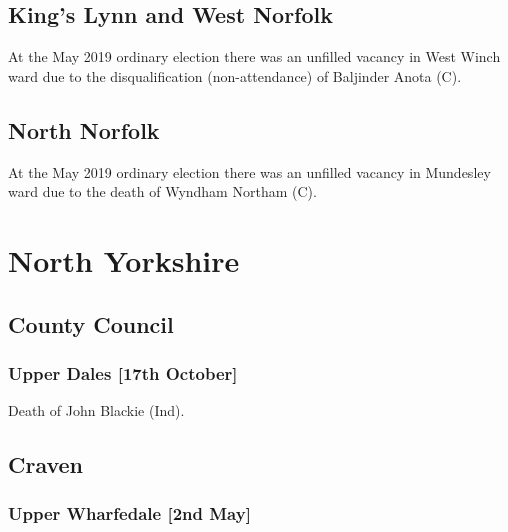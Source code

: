 \documentclass[a4paper,openany]{book}
\begin{document}
\begin{resultsiii}
\subsection*{King's Lynn and West Norfolk}

At the May 2019 ordinary election there was an unfilled vacancy in West Winch ward due to the disqualification (non-attendance) of Baljinder Anota (C).

\subsection*{North Norfolk}

At the May 2019 ordinary election there was an unfilled vacancy in Mundesley ward due to the death of Wyndham Northam (C).

\section{North Yorkshire}

\subsection*{County Council}

\subsubsection*{Upper Dales \hspace*{\fill}\nolinebreak[1]%
	\enspace\hspace*{\fill}
	[17th October]}


Death of John Blackie (Ind).

\subsection*{Craven}

\subsubsection*{Upper Wharfedale \hspace*{\fill}\nolinebreak[1]%
	\enspace\hspace*{\fill}
	[2nd May]}


\end{resultsiii}
\end{document}
